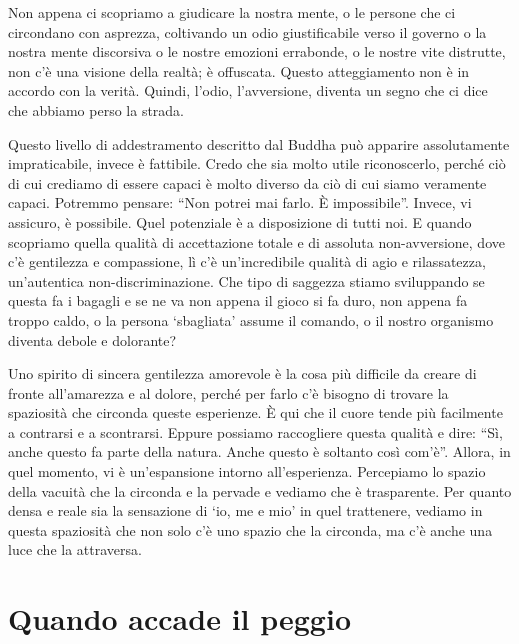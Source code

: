 Non appena ci scopriamo a giudicare la nostra mente, o le persone che ci circondano con asprezza, coltivando un odio giustificabile verso il governo o la nostra mente discorsiva o le nostre emozioni errabonde, o le nostre vite distrutte, non c'è una visione della realtà; è offuscata. Questo atteggiamento non è in accordo con la verità. Quindi, l'odio, l'avversione, diventa un segno che ci dice che abbiamo perso la strada.

Questo livello di addestramento descritto dal Buddha può apparire assolutamente impraticabile, invece è fattibile. Credo che sia molto utile riconoscerlo, perché ciò di cui crediamo di essere capaci è molto diverso da ciò di cui siamo veramente capaci. Potremmo pensare: ``Non potrei mai farlo. È impossibile''. Invece, vi assicuro, è possibile. Quel potenziale è a disposizione di tutti noi. E quando scopriamo quella qualità di accettazione totale e di assoluta non-avversione, dove c'è gentilezza e compassione, lì c'è un'incredibile qualità di agio e rilassatezza, un'autentica non-discriminazione. Che tipo di saggezza stiamo sviluppando se questa fa i bagagli e se ne va non appena il gioco si fa duro, non appena fa troppo caldo, o la persona `sbagliata' assume il comando, o il nostro organismo diventa debole e dolorante?

Uno spirito di sincera gentilezza amorevole è la cosa più difficile da creare di fronte all'amarezza e al dolore, perché per farlo c'è bisogno di trovare la spaziosità che circonda queste esperienze. È qui che il cuore tende più facilmente a contrarsi e a scontrarsi. Eppure possiamo raccogliere questa qualità e dire: ``Sì, anche questo fa parte della natura. Anche questo è soltanto così com'è''. Allora, in quel momento, vi è un'espansione intorno all'esperienza. Percepiamo lo spazio della vacuità che la circonda e la pervade e vediamo che è trasparente. Per quanto densa e reale sia la sensazione di `io, me e mio' in quel trattenere, vediamo in questa spaziosità che non solo c'è uno spazio che la circonda, ma c'è anche una luce che la attraversa.

\section*{Quando accade il peggio}

